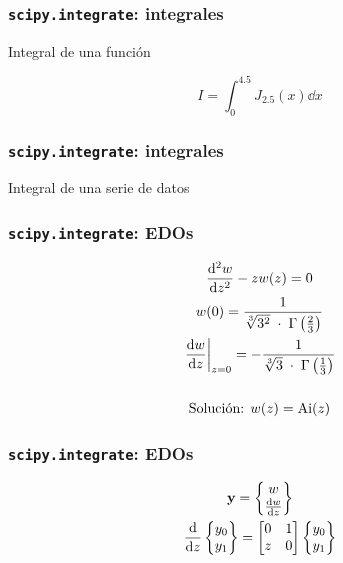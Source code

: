\documentclass{beamer}
\begin{document}
\begin{frame}\frametitle{\texttt{scipy.integrate}: integrales}
	
	\begin{block}{Integral de una función}

	$$ I = \int_0^{4.5} J_{2.5}(x)\dd{x}$$

		
	\end{block}
\end{frame}

\begin{frame}\frametitle{\texttt{scipy.integrate}: integrales}
	\begin{block}{Integral de una serie de datos}
		
	\end{block}
\end{frame}

\begin{frame}\frametitle{\texttt{scipy.integrate}: EDOs}
	\begin{gather*}
		\dv[2]{w}{z} - z w(z) = 0\\
		w(0) = \frac{1}{\sqrt[3]{3^2}\;\cdot\; \Gamma\left(\frac{2}{3}\right)}\\
		\left.\dv{w}{z}\right|_{z=0} = - \frac{1}{\sqrt[3]{3}\;\cdot\; \Gamma\left(\frac{1}{3}\right)}\\
		\quad \\
		\text{Solución: } w(z) = \mathrm{Ai}(z)
	\end{gather*}
\end{frame}

\begin{frame}\frametitle{\texttt{scipy.integrate}: EDOs}
	\begin{gather*}
		\vb{y} = \begin{Bmatrix}
			w \\
			\dv{w}{z}
		\end{Bmatrix} \\
		\dv{}{z} 
		\begin{Bmatrix}
			y_0 \\ y_1
		\end{Bmatrix}
		= 
		\begin{bmatrix}
			0 & 1 \\
			z & 0 \\
		\end{bmatrix}  
		\begin{Bmatrix}
			y_0 \\ y_1
		\end{Bmatrix}
	\end{gather*}
\end{frame}
\end{document}
